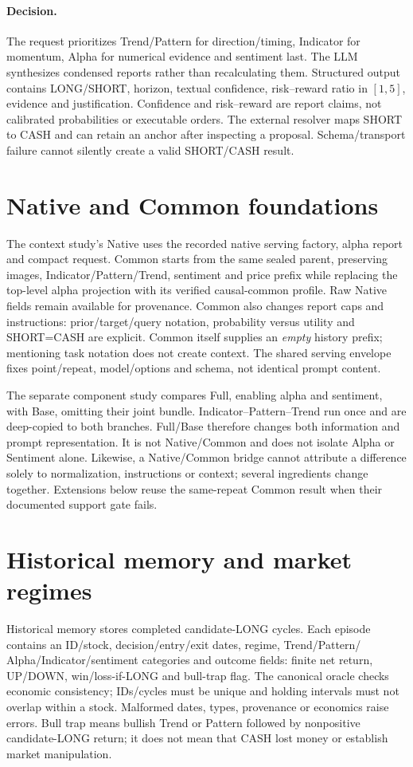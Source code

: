 \paragraph{Decision.}
The request prioritizes Trend/Pattern for direction/timing, Indicator for
momentum, Alpha for numerical evidence and sentiment last. The LLM
synthesizes condensed reports rather than recalculating them. Structured
output contains LONG/SHORT, horizon, textual confidence, risk--reward
ratio in $[1,5]$, evidence and justification. Confidence and risk--reward
are report claims, not calibrated probabilities or executable orders.
The external resolver maps SHORT to CASH and can retain an anchor after
inspecting a proposal. Schema/transport failure cannot silently create
a valid SHORT/CASH result.

\section{Native and Common foundations}\label{s:34c72d872d464412}
The context study's Native uses the recorded native serving factory,
alpha report and compact request. Common starts from the same sealed
parent, preserving images, Indicator/Pattern/Trend, sentiment and price
prefix while replacing the top-level alpha projection with its verified
causal-common profile. Raw Native fields remain available for provenance.
Common also changes report caps and instructions: prior/target/query
notation, probability versus utility and SHORT=CASH are explicit. Common
itself supplies an \emph{empty} history prefix; mentioning task notation
does not create context. The shared serving envelope fixes point/repeat,
model/options and schema, not identical prompt content.

The separate component study compares Full, enabling alpha and sentiment,
with Base, omitting their joint bundle. Indicator--Pattern--Trend run once
and are deep-copied to both branches. Full/Base therefore changes both
information and prompt representation. It is not Native/Common and does
not isolate Alpha or Sentiment alone. Likewise, a Native/Common bridge
cannot attribute a difference solely to normalization, instructions or
context; several ingredients change together. Extensions below reuse
the same-repeat Common result when their documented support gate fails.

\section{Historical memory and market regimes}\label{s:caa6b0b420cdae1c}
Historical memory stores completed candidate-LONG cycles. Each episode
contains an ID/stock, decision/entry/exit dates, regime, Trend/Pattern/
Alpha/Indicator/sentiment categories and outcome fields: finite net return,
UP/DOWN, win/loss-if-LONG and bull-trap flag. The canonical oracle checks
economic consistency; IDs/cycles must be unique and holding intervals
must not overlap within a stock. Malformed dates, types, provenance or
economics raise errors. Bull trap means bullish Trend or Pattern followed
by nonpositive candidate-LONG return; it does not mean that CASH lost
money or establish market manipulation.

